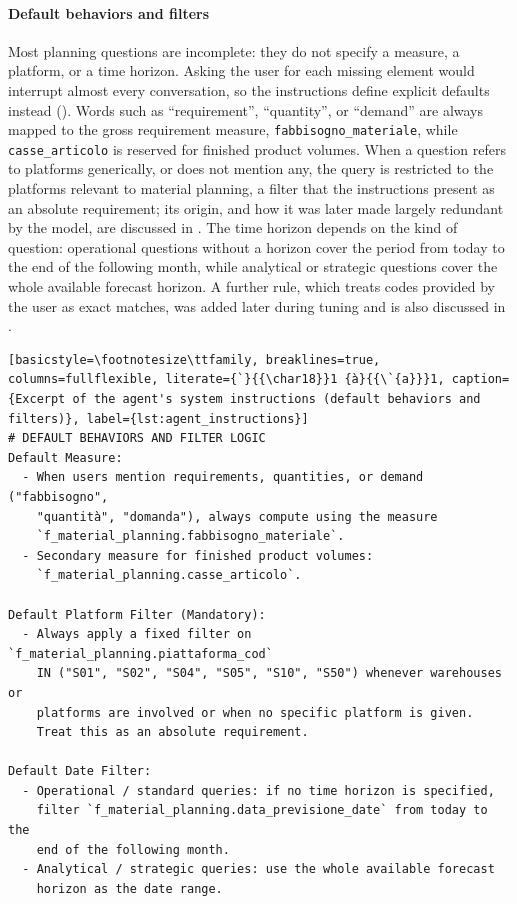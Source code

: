 \paragraph{Default behaviors and filters}
Most planning questions are incomplete: they do not specify a measure, a platform, or a time horizon. Asking the user for each missing element would interrupt almost every conversation, so the instructions define explicit defaults instead (). Words such as ``requirement'', ``quantity'', or ``demand'' are always mapped to the gross requirement measure, \texttt{fabbisogno\_\allowbreak materiale}, while \texttt{casse\_\allowbreak articolo} is reserved for finished product volumes. When a question refers to platforms generically, or does not mention any, the query is restricted to the platforms relevant to material planning, a filter that the instructions present as an absolute requirement; its origin, and how it was later made largely redundant by the model, are discussed in . The time horizon depends on the kind of question: operational questions without a horizon cover the period from today to the end of the following month, while analytical or strategic questions cover the whole available forecast horizon. A further rule, which treats codes provided by the user as exact matches, was added later during tuning and is also discussed in .

\begin{lstlisting}[basicstyle=\footnotesize\ttfamily, breaklines=true, columns=fullflexible, literate={`}{{\char18}}1 {à}{{\`{a}}}1, caption={Excerpt of the agent's system instructions (default behaviors and filters)}, label={lst:agent_instructions}]
# DEFAULT BEHAVIORS AND FILTER LOGIC
Default Measure:
  - When users mention requirements, quantities, or demand ("fabbisogno",
    "quantità", "domanda"), always compute using the measure
    `f_material_planning.fabbisogno_materiale`.
  - Secondary measure for finished product volumes:
    `f_material_planning.casse_articolo`.

Default Platform Filter (Mandatory):
  - Always apply a fixed filter on `f_material_planning.piattaforma_cod`
    IN ("S01", "S02", "S04", "S05", "S10", "S50") whenever warehouses or
    platforms are involved or when no specific platform is given.
    Treat this as an absolute requirement.

Default Date Filter:
  - Operational / standard queries: if no time horizon is specified,
    filter `f_material_planning.data_previsione_date` from today to the
    end of the following month.
  - Analytical / strategic queries: use the whole available forecast
    horizon as the date range.
\end{lstlisting}

